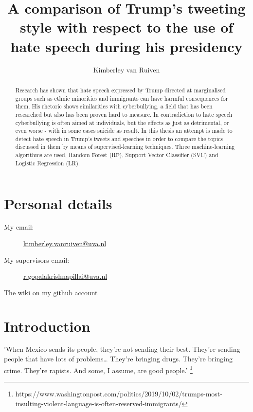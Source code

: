 \documentclass[a4paper,pdf]{article} %
\begin{document}
\title{A comparison of Trump's tweeting style with respect to the use of hate speech during his presidency} %
\author{Kimberley van Ruiven}

\maketitle


\begin{abstract}Research has shown that hate speech expressed by Trump directed at marginalised groups such as ethnic minorities and immigrants can have harmful consequences for them. His rhetoric shows similarities with cyberbullying, a field that has been researched but also has been proven hard to measure. In contradiction to hate speech cyberbullying is often aimed at individuals, but the effects as just as detrimental, or even worse - with in some cases suicide as result. In this thesis an attempt is made to detect hate speech in Trump's tweets and speeches in order to compare the topics discussed in them by means of supervised-learning techniques. Three machine-learning algorithms are used, Random Forest (RF), Support Vector Classifier (SVC) and Logistic Regression (LR). 

\end{abstract}

\section{Personal details}

\begin{description}
 \item[My email:] \url{ kimberley.vanruiven@uva.nl }
 \item[My supervisors email:] \url{r.gopalakrishnapillai@uva.nl }
 \item[The wiki on my github account] \url{}
 \end{description} 

\section{Introduction}


'When Mexico sends its people, they’re not sending their best. They’re sending people that have lots of problems… They’re bringing drugs. They’re bringing crime. They’re rapists. And some, I assume, are good people.' \footnote{https://www.washingtonpost.com/politics/2019/10/02/trumps-most-insulting-violent-language-is-often-reserved-immigrants/} \\ 
\end{document}
